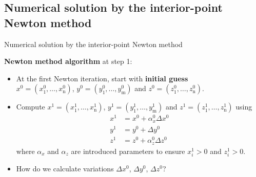 \subsection{Numerical solution by the interior-point Newton method}
%
\begin{frame}{Numerical solution by the interior-point Newton method}

\alert{\bf Newton method algorithm} at step 1: 
%
\begin{itemize}
\item At the first Newton iteration, start with {\bf initial guess} \\
${x^{0}=(x_{1}^{0},\ldots,x_{\text{n}}^{0})}$,
${y^{0}=(y_{1}^{0},\ldots,y_{\text{m}}^{0})}$ and ${z^{0}=(z_{1}^{0},\ldots,z_{\text{n}}^{0})}$. 
\end{itemize}

\begin{itemize}
\item Compute ${x^{1}=(x_{1}^{1},\ldots,x_{\text{n}}^{1})}$, ${y^{1}=(y_{1}^{1},\ldots,y_{\text{m}}^{1})}$
and ${z^{1}=(z_{1}^{1},\ldots,z_{\text{n}}^{1})}$ using
\begin{align*}
x^{1} & =x^{0}+\alpha_{x}^{0}\Delta x^{0}\\
y^{1} & =y^{0}+\Delta y^{0}\\
z^{1} & =z^{0}+\alpha_{z}^{0}\Delta z^{0}
\end{align*}
where $\alpha_{x}$ and $\alpha_{z}$ are introduced parameters to ensure $x_{i}^{1}>0$ and $z_{i}^{1}>0$. 
\item How do we calculate variations 
$\Delta x^{0}$, $\Delta y^{0}$, $\Delta z^{0}$?
\end{itemize}

\end{frame}
%
